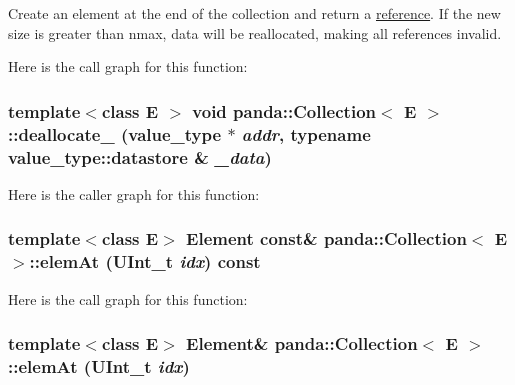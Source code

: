 Create an element at the end of the collection and return a \hyperlink{namespacepanda_1_1reference}{reference}. If the new size is greater than nmax, data will be reallocated, making all references invalid. 

Here is the call graph for this function:\hypertarget{classpanda_1_1Collection_a74432be483a033e44ee2c7860487b20c}{
\subsubsection[{deallocate\_\-}]{\setlength{\rightskip}{0pt plus 5cm}template$<$class E $>$ void {\bf panda::Collection}$<$ E $>$::deallocate\_\- ({\bf value\_\-type} $\ast$ {\em addr}, \/  typename value\_\-type::datastore \& {\em \_\-data})}}
\label{classpanda_1_1Collection_a74432be483a033e44ee2c7860487b20c}


Here is the caller graph for this function:\hypertarget{classpanda_1_1Collection_a2d634c66148b760ddd2779ff559d6511}{
\subsubsection[{elemAt}]{\setlength{\rightskip}{0pt plus 5cm}template$<$class E$>$ {\bf Element} const\& {\bf panda::Collection}$<$ E $>$::elemAt (UInt\_\-t {\em idx}) const}}
\label{classpanda_1_1Collection_a2d634c66148b760ddd2779ff559d6511}


Here is the call graph for this function:\hypertarget{classpanda_1_1Collection_add5ee7e7d1969880a3f00de700425d67}{
\subsubsection[{elemAt}]{\setlength{\rightskip}{0pt plus 5cm}template$<$class E$>$ {\bf Element}\& {\bf panda::Collection}$<$ E $>$::elemAt (UInt\_\-t {\em idx})}}
\label{classpanda_1_1Collection_add5ee7e7d1969880a3f00de700425d67}



